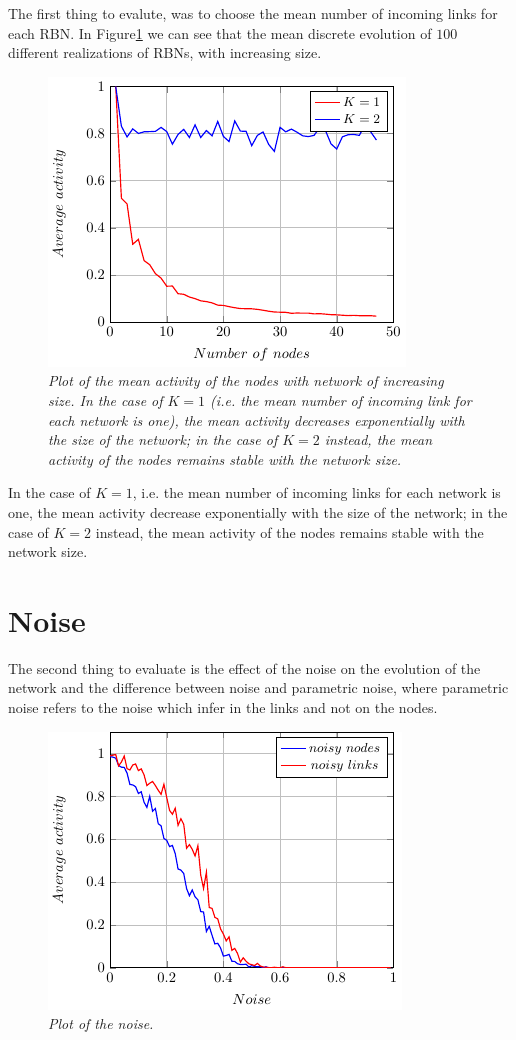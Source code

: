 The first thing to evalute, was to choose the mean number of incoming links for each RBN. In Figure\ref{fig:K} we can see that the mean discrete evolution of $100$ different realizations of RBNs, with increasing size.
\begin{figure}[h]
\centering
\includegraphics[scale=1.5]{images/K.pdf}
\caption{\emph{Plot of the mean activity of the nodes with network of increasing size.
In the case of $K=1$ (i.e. the mean number of incoming link for each network is one), the mean activity decreases exponentially with the size of the network; in the case of $K=2$ instead, the mean activity of the nodes remains stable with the network size.}}
\label{fig:K}
\end{figure}
In the case of $K=1$, i.e. the mean number of incoming links for each network is one, the mean activity decrease exponentially with the size of the network; in the case of $K=2$ instead, the mean activity of the nodes remains stable with the network size.

\section{Noise}
The second thing to evaluate is the effect of the noise on the evolution of the network and the difference between noise and parametric noise, where parametric noise refers to the noise which infer in the links and not on the nodes.
\begin{figure}[h]
\centering
\includegraphics[scale=1.5]{images/noise.pdf}
\caption{\emph{Plot of the noise.}}
\label{fig:noise}
\end{figure}
